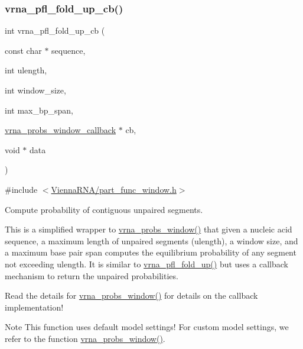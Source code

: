 \subsubsection{\texorpdfstring{vrna\_pfl\_fold\_up\_cb()}{vrna\_pfl\_fold\_up\_cb()}}
{\footnotesize\ttfamily int vrna\+\_\+pfl\+\_\+fold\+\_\+up\+\_\+cb (\begin{DoxyParamCaption}\item[{const char $\ast$}]{sequence,  }\item[{int}]{ulength,  }\item[{int}]{window\+\_\+size,  }\item[{int}]{max\+\_\+bp\+\_\+span,  }\item[{\mbox{\hyperlink{group__part__func__window_gabe710a1182e6db69cc75329dfc9bed67}{vrna\+\_\+probs\+\_\+window\+\_\+callback}} $\ast$}]{cb,  }\item[{void $\ast$}]{data }\end{DoxyParamCaption})}



{\ttfamily \#include $<$\mbox{\hyperlink{part__func__window_8h}{Vienna\+R\+N\+A/part\+\_\+func\+\_\+window.\+h}}$>$}



Compute probability of contiguous unpaired segments. 

This is a simplified wrapper to \mbox{\hyperlink{group__part__func__window_ga7115d012988541a65ec323c5f17a334b}{vrna\+\_\+probs\+\_\+window()}} that given a nucleic acid sequence, a maximum length of unpaired segments ({\ttfamily ulength}), a window size, and a maximum base pair span computes the equilibrium probability of any segment not exceeding {\ttfamily ulength}. It is similar to \mbox{\hyperlink{group__part__func__window_ga1dd5c51b797c961124912e289bff553a}{vrna\+\_\+pfl\+\_\+fold\+\_\+up()}} but uses a callback mechanism to return the unpaired probabilities.

Read the details for \mbox{\hyperlink{group__part__func__window_ga7115d012988541a65ec323c5f17a334b}{vrna\+\_\+probs\+\_\+window()}} for details on the callback implementation!

\begin{DoxyNote}{Note}
This function uses default model settings! For custom model settings, we refer to the function \mbox{\hyperlink{group__part__func__window_ga7115d012988541a65ec323c5f17a334b}{vrna\+\_\+probs\+\_\+window()}}.
\end{DoxyNote}

